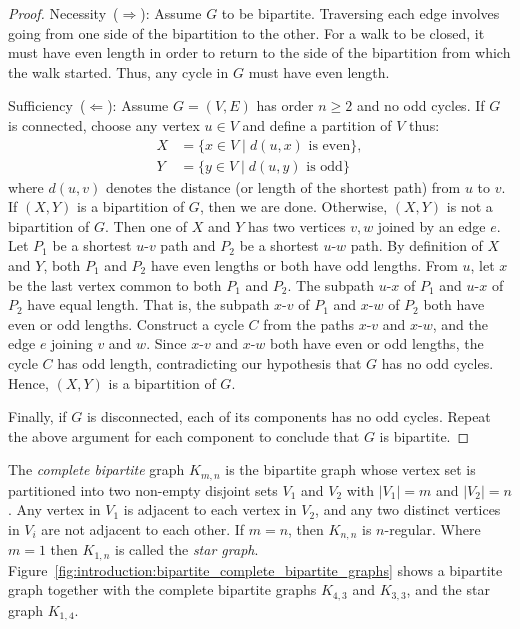 \begin{proof}
Necessity~($\Longrightarrow$): Assume $G$ to be bipartite. Traversing
each edge involves going from one side of the bipartition to the
other. For a walk to be closed, it must have even length in order to
return to the side of the bipartition from which the walk
started. Thus, any cycle in $G$ must have even length.

Sufficiency~($\Longleftarrow$): Assume $G = (V, E)$ has order
$n \geq 2$ and no odd cycles. If $G$ is connected, choose any vertex
$u \in V$ and define a partition of $V$ thus:
\begin{align*}
X &= \{x \in V \mid d(u,x) \text{ is even}\}, \\
Y &= \{y \in V \mid d(u,y) \text{ is odd}\}
\end{align*}
where $d(u,v)$ denotes the distance (or length of the shortest path)
from $u$ to $v$. If $(X, Y)$ is a bipartition of $G$, then we are
done. Otherwise, $(X, Y)$ is not a bipartition of $G$. Then one of $X$
and $Y$ has two vertices $v,w$ joined by an edge $e$. Let $P_1$ be a
shortest $u$-$v$ path and $P_2$ be a shortest $u$-$w$ path. By
definition of $X$ and $Y$, both $P_1$ and $P_2$ have even lengths or
both have odd lengths. From $u$, let $x$ be the last vertex common to
both $P_1$ and $P_2$. The subpath $u$-$x$ of $P_1$ and $u$-$x$ of
$P_2$ have equal length. That is, the subpath $x$-$v$ of $P_1$ and
$x$-$w$ of $P_2$ both have even or odd lengths. Construct a cycle $C$
from the paths $x$-$v$ and $x$-$w$, and the edge $e$ joining $v$ and
$w$. Since $x$-$v$ and $x$-$w$ both have even or odd lengths, the
cycle $C$ has odd length, contradicting our hypothesis that $G$ has no
odd cycles. Hence, $(X,Y)$ is a bipartition of $G$.

Finally, if $G$ is disconnected, each of its components has no odd
cycles. Repeat the above argument for each component to conclude that
$G$ is bipartite.
\end{proof}

The \emph{complete bipartite} graph
$K_{m,n}$ is the bipartite graph whose vertex set is
partitioned into two non-empty disjoint sets $V_1$ and $V_2$ with
$|V_1| = m$ and $|V_2| = n$. Any vertex in $V_1$ is adjacent to each
vertex in $V_2$, and any two distinct vertices in $V_i$ are not
adjacent to each other. If $m = n$, then $K_{n,n}$ is
$n$-regular. Where $m = 1$ then $K_{1,n}$ is called the
\emph{star graph}.
Figure~\ref{fig:introduction:bipartite_complete_bipartite_graphs}
shows a bipartite graph together with the complete bipartite graphs
$K_{4,3}$ and $K_{3,3}$, and the star graph $K_{1,4}$.

